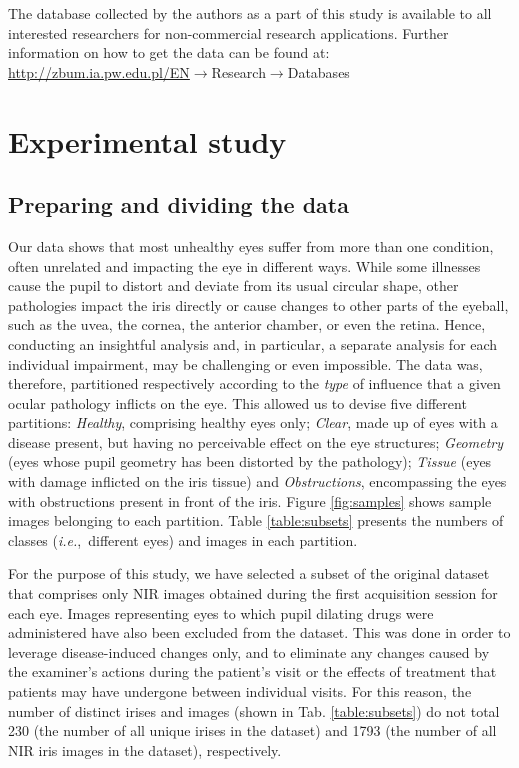 \documentclass[article,12pt]{elsarticle}
\newcommand{\ie}{{\it i.e.},~}
\begin{document}
The database collected by the authors as a part of this study is available to all interested researchers for non-commercial research applications. Further information on how to get the data can be found at: \url{http://zbum.ia.pw.edu.pl/EN}$\rightarrow$Research$\rightarrow$Databases


\section{Experimental study}
\label{section:experimental}

\subsection{Preparing and dividing the data} 

Our data shows that most unhealthy eyes suffer from more than one condition, often unrelated and impacting the eye in different ways. While some illnesses cause the pupil to distort and deviate from its usual circular shape, other pathologies impact the iris directly or cause changes to other parts of the eyeball, such as the uvea, the cornea, the anterior chamber, or even the retina. Hence, conducting an insightful analysis and, in particular, a separate analysis for each individual impairment, may be challenging or even impossible. The data was, therefore, partitioned respectively according to the \emph{type} of influence that a given ocular pathology inflicts on the eye. This allowed us to devise five different partitions: \emph{Healthy}, comprising healthy eyes only; \emph{Clear}, made up of eyes with a disease present, but having no perceivable effect on the eye structures; \emph{Geometry} (eyes whose pupil geometry has been distorted by the pathology); \emph{Tissue} (eyes with damage inflicted on the iris tissue) and \emph{Obstructions}, encompassing the eyes with obstructions present in front of the iris. Figure \ref{fig:samples} shows sample images belonging to each partition. Table \ref{table:subsets} presents the numbers of classes (\ie different eyes) and images in each partition.

For the purpose of this study, we have selected a subset of the original dataset that comprises only NIR images obtained during the first acquisition session for each eye. Images representing eyes to which pupil dilating drugs were administered have also been excluded from the dataset. This was done in order to leverage disease-induced changes only, and to eliminate any changes caused by the examiner’s actions during the patient’s visit or the effects of treatment that patients may have undergone between individual visits. For this reason, the number of distinct irises and images (shown in Tab. \ref{table:subsets}) do not total 230 (the number of all unique irises in the dataset) and 1793 (the number of all NIR iris images in the dataset), respectively.
\end{document}
